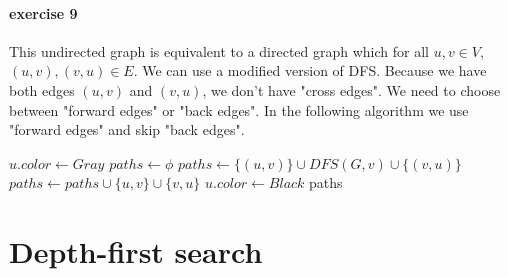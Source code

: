 \documentclass{book}
\begin{document}
	\paragraph{exercise 9}
	This undirected graph is equivalent to a directed graph which for all $u, v \in V$, $(u, v), (v, u) \in E$. We can use a modified version of DFS. Because we have both edges $(u, v)$ and $(v, u)$, we don't have "cross edges". We need to choose between "forward edges" or "back edges". In the following algorithm we use "forward edges" and skip "back edges".
	\begin{algorithm*}
		\begin{algorithmic}[1]
				\State $u.color \gets Gray$
				\State $paths \gets \phi$
					 
						\State $paths \gets \{(u, v)\} \cup DFS(G, v) \cup \{(v, u)\}$
					 
						\State $paths \gets paths \cup \{u, v\} \cup \{v, u\}$
					\EndIf
				\EndFor
				\State $u.color \gets Black$
				\State \Return paths
			\EndFunction
		\end{algorithmic}
	\end{algorithm*}
	\FloatBarrier
	\section{Depth-first search}
\end{document}
